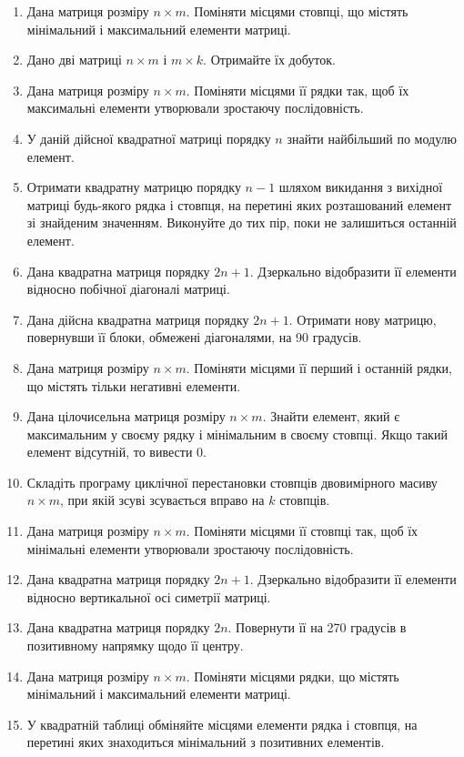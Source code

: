 \documentclass[]{article}
\makeatletter
\newcommand{\xslalph}[1]{\expandafter\@xslalph\csname c@#1\endcsname}
\newcommand{\@xslalph}[1]{%
    \ifcase#1\or а\or б\or в\or г\or д\or e\or є\or ж\or з\or i%
    \or й\or к\or л\or м\or н\or о\or п\or р\or с\or т%
    \or у\or ф\or х\or ц\or ч\or ш\or ю\or я\or аа\or бб\or вв%
    \else\@ctrerr\fi%
}
\makeatother
\begin{document}
\begin{enumerate}
\begin{enumerate}[label=\xslalph*)]
\begin{enumerate}
\begin{enumerate}[label=\xslalph*)]
\begin{enumerate}
\item
  Дана матриця розміру $n \times m$. Поміняти місцями стовпці, що містять
  мінімальний і максимальний елементи матриці.
\item
  Дано дві матриці $n \times m$ і $m \times k$. Отримайте їх добуток.
\item
  Дана матриця розміру $n \times m$. Поміняти місцями її рядки так, щоб їх
  максимальні елементи утворювали зростаючу послідовність.
\item
  У даній дійсної квадратної матриці порядку $n$ знайти найбільший по
  модулю елемент.
\item
  Отримати квадратну матрицю порядку $n - 1$ шляхом викидання з вихідної
  матриці будь-якого рядка і стовпця, на перетині яких розташований
  елемент зі знайденим значенням. Виконуйте до тих пір, поки не
  залишиться останній елемент.
\item
  Дана квадратна матриця порядку $2n + 1$. Дзеркально відобразити її
  елементи відносно побічної діагоналі матриці.
\item
  Дана дійсна квадратна матриця порядку $2n + 1$. Отримати нову матрицю,
  повернувши її блоки, обмежені діагоналями, на 90 градусів.
\item
  Дана матриця розміру $n \times m$. Поміняти місцями її перший і останній
  рядки, що містять тільки негативні елементи.
\item
  Дана цілочисельна матриця розміру $n \times m$. Знайти елемент, який є
  максимальним у своєму рядку і мінімальним в своєму стовпці. Якщо такий
  елемент відсутній, то вивести 0.
\item
  Складіть програму циклічної перестановки стовпців двовимірного масиву
  $n \times m$, при якій зсуві зсувається вправо на $k$ стовпців.
\item
  Дана матриця розміру $n \times m$. Поміняти місцями її стовпці так, щоб їх
  мінімальні елементи утворювали зростаючу послідовність.
\item
  Дана квадратна матриця порядку $2n + 1$. Дзеркально відобразити її
  елементи відносно вертикальної осі симетрії матриці.
\item
  Дана квадратна матриця порядку $2n$. Повернути її на 270 градусів в
  позитивному напрямку щодо її центру.
\item
  Дана матриця розміру $n \times m$. Поміняти місцями рядки, що містять
  мінімальний і максимальний елементи матриці.
\item
  У квадратній таблиці обміняйте місцями елементи рядка і стовпця, на
  перетині яких знаходиться мінімальний з позитивних елементів.

\end{enumerate}
\end{enumerate}
\end{enumerate}
\end{enumerate}
\end{enumerate}
\end{document}
